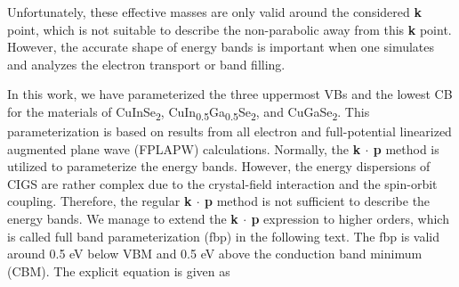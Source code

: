 \documentclass[a4paper, 12pt, titlepage,oneside,drop]{kthesis}
\begin{document}
 
Unfortunately, these effective masses are only valid around the considered {\textbf k} point, which is not suitable to describe the non-parabolic away from this {\textbf k} point. However, the accurate shape of energy bands is 
important when one simulates and analyzes the electron transport or band filling.

In this work, we have parameterized the three uppermost VBs and the lowest CB for the materials of CuInSe\textsubscript2, CuIn\textsubscript{0.5}Ga\textsubscript{0.5}Se\textsubscript{2}, 
and CuGaSe\textsubscript{2}. This parameterization is based on results from all electron and full-potential linearized augmented plane wave (FPLAPW) calculations. Normally, the \textbf{k $\cdot$ p} method is utilized to 
parameterize the energy bands. However, the energy dispersions of CIGS are rather complex due to the crystal-field interaction and the spin-orbit coupling. Therefore, the regular \textbf{k $\cdot$ p} method is not sufficient 
to describe the energy bands. We manage to extend the \textbf{k $\cdot$ p} expression to higher orders, which is called full band parameterization (fbp) in the following text. The fbp is valid around 0.5 eV below VBM and 0.5 eV 
above the conduction band minimum (CBM). The explicit equation is given as
\end{document}
